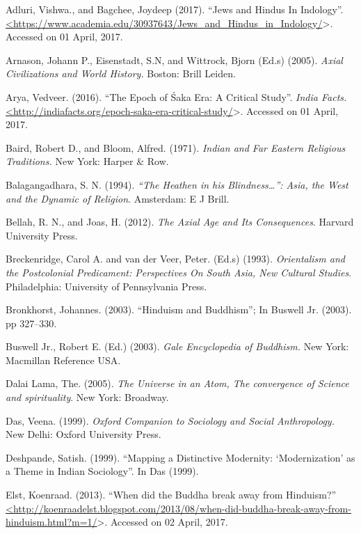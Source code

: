 \begin{thebibliography}{99}
\itemsep=1pt
 Adluri, Vishwa., and Bagchee, Joydeep (2017). “Jews and Hindus In Indology”. \url{<https://www.academia.edu/30937643/Jews_and_Hindus_in_Indology/}\textgreater . Accessed on 01 April, 2017.

  Arnason, Johann P., Eisenstadt, S.N, and Wittrock, Bjorn (Ed.s) (2005). \textit{Axial Civilizations and World History.} Boston: Brill Leiden.

  Arya, Vedveer. (2016). “The Epoch of Śaka Era: A Critical Study”. \textit{India Facts.} \url{<http://indiafacts.org/epoch-saka-era-critical-study/}\textgreater . Accessed on 01 April, 2017.

  Baird, Robert D., and Bloom, Alfred. (1971). \textit{Indian and Far Eastern Religious Traditions.} New York: Harper \& Row.

  Balagangadhara, S. N. (1994). \textit{“The Heathen in his Blindness…”: Asia, the West and the Dynamic of Religion}. Amsterdam: E J Brill.

  Bellah, R. N., and Joas, H. (2012). \textit{The Axial Age and Its Consequences}. Harvard University Press.

  Breckenridge, Carol A. and van der Veer, Peter. (Ed.s) (1993). \textit{Orientalism and the Postcolonial Predicament: Perspectives On South Asia, New Cultural Studies}. Philadelphia: University of Pennsylvania Press.

  Bronkhorst, Johannes. (2003). “Hinduism and Buddhism”; In Buswell Jr. (2003). pp 327--330.

  Buswell Jr., Robert E. (Ed.) (2003). \textit{Gale Encyclopedia of Buddhism.} New York: Macmillan Reference USA.

  Dalai Lama, The. (2005). \textit{The Universe in an Atom, The convergence of Science and spirituality}. New York: Broadway.

  Das, Veena. (1999). \textit{Oxford Companion to Sociology and Social Anthropology.} New Delhi: Oxford University Press.

  Deshpande, Satish. (1999). “Mapping a Distinctive Modernity: ‘Modernization’ as a Theme in Indian Sociology”. In Das (1999).

  Elst, Koenraad. (2013). “When did the Buddha break away from Hinduism?” \url{<http://koenraadelst.blogspot.com/2013/08/when-did-buddha-break-away-from-hinduism.html?m=1/}\textgreater . Accessed on 02 April, 2017.


\end{thebibliography}
